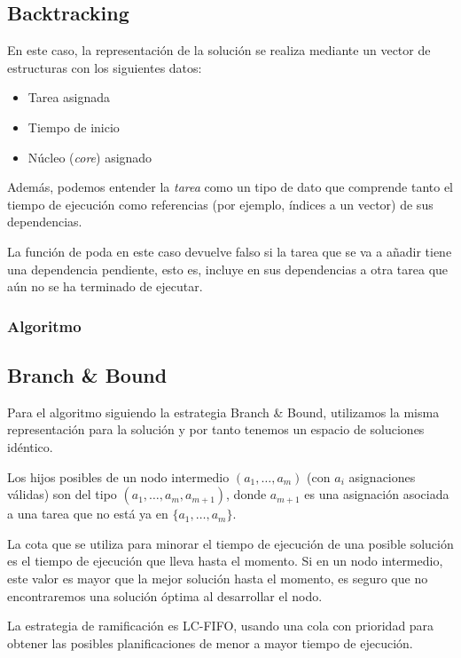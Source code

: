 \documentclass[a4paper, 11pt]{article} %
\begin{document}
    
    \subsection{Backtracking}
    En este caso, la representación de la solución se realiza mediante un vector de estructuras con los siguientes datos:
    \begin{itemize}
        \item Tarea asignada
        \item Tiempo de inicio
        \item Núcleo (\textit{core}) asignado
    \end{itemize}
    Además, podemos entender la \textit{tarea} como un tipo de dato que comprende tanto el tiempo de ejecución como referencias (por ejemplo, índices a un vector) de sus dependencias.
    
    La función de poda en este caso devuelve falso si la tarea que se va a añadir tiene una dependencia pendiente, esto es, incluye en sus dependencias a otra tarea que aún no se ha terminado de ejecutar.
    
    \subsubsection{Algoritmo}
    
    \subsection{Branch \& Bound}
      Para el algoritmo siguiendo la estrategia Branch \& Bound, utilizamos la misma representación para la 
      solución y por tanto tenemos un espacio de soluciones idéntico.
      
      Los hijos posibles de un nodo intermedio $(a_1, \dots, a_m)$ (con $a_i$ asignaciones válidas) son del tipo 
      $(a_1, \dots, a_m, a_{m+1})$, donde $a_{m+1}$ es una asignación asociada a una tarea que no está ya en 
      $\{a_1, \dots, a_m\}$.
      
      La cota que se utiliza para minorar el tiempo de ejecución de una posible solución es el tiempo de ejecución 
      que lleva hasta el momento. Si en un nodo intermedio, este valor es mayor que la mejor solución hasta el 
      momento, es seguro que no encontraremos una solución óptima al desarrollar el nodo.
      
      La estrategia de ramificación es LC-FIFO, usando una cola con prioridad para obtener las posibles 
      planificaciones de menor a mayor tiempo de ejecución.
    
\end{document}
